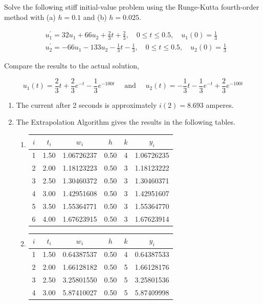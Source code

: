 \begin{posttest}
\item Solve the following stiff initial-value problem using the Runge-Kutta fourth-order method with (a) $h=0.1$ and (b) $h=0.025$.


$$
\begin{aligned}
& u_{1}^{\prime}=32 u_{1}+66 u_{2}+\frac{2}{3} t+\frac{2}{3}, \quad 0 \leq t \leq 0.5, \quad u_{1}(0)=\frac{1}{3} \\
& u_{2}^{\prime}=-66 u_{1}-133 u_{2}-\frac{1}{3} t-\frac{1}{3}, \quad 0 \leq t \leq 0.5, \quad u_{2}(0)=\frac{1}{3}
\end{aligned}
$$

Compare the results to the actual solution,

$$
u_{1}(t)=\frac{2}{3} t+\frac{2}{3} e^{-t}-\frac{1}{3} e^{-100 t} \quad \text { and } \quad u_{2}(t)=-\frac{1}{3} t-\frac{1}{3} e^{-t}+\frac{2}{3} e^{-100 t}
$$

\begin{mysolution}
\begin{enumerate}[label=\arabic*.]
  \item The current after 2 seconds is approximately $i(2)=8.693$ amperes.

\item The Extrapolation Algorithm gives the results in the following tables.\\
\begin{enumerate}[label=(\alph*).]
\item

\begin{center}
\begin{tabular}{cccccc}
\hline
$i$ & $t_{i}$ & $w_{i}$ & $h$ & $k$ & $y_{i}$ \\
\hline
1 & 1.50 & 1.06726237 & 0.50 & 4 & 1.06726235 \\
2 & 2.00 & 1.18123223 & 0.50 & 3 & 1.18123222 \\
3 & 2.50 & 1.30460372 & 0.50 & 3 & 1.30460371 \\
4 & 3.00 & 1.42951608 & 0.50 & 3 & 1.42951607 \\
5 & 3.50 & 1.55364771 & 0.50 & 3 & 1.55364770 \\
6 & 4.00 & 1.67623915 & 0.50 & 3 & 1.67623914 \\
\hline
\end{tabular}
\end{center}

\item

\begin{center}
\begin{tabular}{cccccc}
\hline
$i$ & $t_{i}$ & $w_{i}$ & $h$ & $k$ & $y_{i}$ \\
\hline
1 & 1.50 & 0.64387537 & 0.50 & 4 & 0.64387533 \\
2 & 2.00 & 1.66128182 & 0.50 & 5 & 1.66128176 \\
3 & 2.50 & 3.25801550 & 0.50 & 5 & 3.25801536 \\
4 & 3.00 & 5.87410027 & 0.50 & 5 & 5.87409998 \\
\hline
\end{tabular}
\end{center}
\end{enumerate}


\end{enumerate}
\end{mysolution}
\end{posttest}
